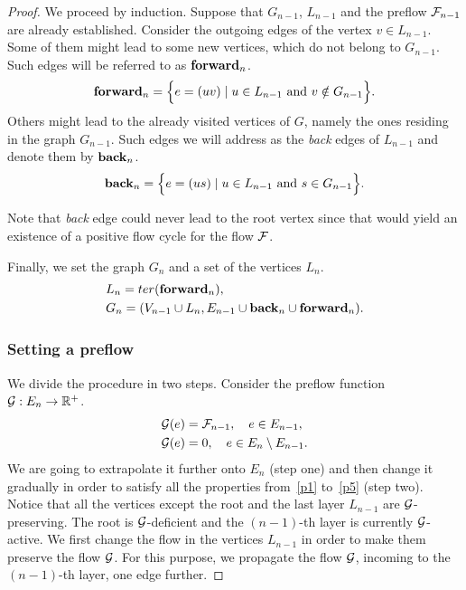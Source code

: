 \documentclass[12pt]{amsart}
\begin{document}
\begin{proof}
        We proceed by induction.
        Suppose that $G_{n-1}$, $L_{n-1}$ and the preflow $\flowposn{n-1}$ are already established.
        Consider the outgoing edges of the vertex $v \in L_{n-1}$.
        Some of them might lead to some new vertices, which do not belong to $G_{n-1}$.
        Such edges will be referred to as $\efor_n$.
        \[
          \efor_n = \Big\{ e = (uv) \mid u \in L_{n-1} \text{ and } v \notin G_{n-1}\Big\}.
        \]
        Others might lead to the already visited vertices of $G$, namely the ones residing in the graph $G_{n-1}$.
        Such edges we will address as the \emph{back} edges of $L_{n-1}$ and denote them by $\eback_n$.
        \[
          \eback_n = \Big\{e = (us) \mid u \in L_{n-1} \text{ and } s \in G_{n-1}\Big\}.
        \]
        \begin{remark}
          Note that \emph{back} edge could never lead to the root vertex since that
            would yield an existence of a positive flow cycle for the flow $\flowpos$.
        \end{remark}
        Finally, we set the graph $G_n$ and a set of the vertices $L_n$.
        \begin{align*}
          &L_n = \ter(\efor_n),\\
          &G_n = (V_{n-1} \cup L_n, E_{n-1} \cup \eback_n \cup \efor_n).
        \end{align*}
      \subsubsection*{Setting a preflow}

        We divide the procedure in two steps.
        Consider the preflow function $\cal{G}: E_n \to \mathbb{R}^{+}$.
        \begin{align*}
          &\cal{G}(e) = \flowposn{n-1}, \quad e \in E_{n-1},\\
          &\cal{G}(e) = 0, \quad e \in E_n \setminus E_{n-1}.
        \end{align*}
        We are going to extrapolate it further onto $E_n$ (step one) and then change it gradually in order
          to satisfy all the properties from~\ref{p1} to~\ref{p5} (step two).
        Notice that all the vertices except the root and the last layer $L_{n-1}$ are $\cal{G}$-preserving.
        The root is $\cal{G}$-deficient and the $(n-1)$-th layer is currently $\cal{G}$-active.
        We first change the flow in the vertices $L_{n-1}$ in order to make them preserve the flow $\cal{G}$.
        For this purpose, we propagate the flow $\cal{G}$, incoming to the $(n-1)$-th layer, one edge further.


\end{proof}
\end{document}
